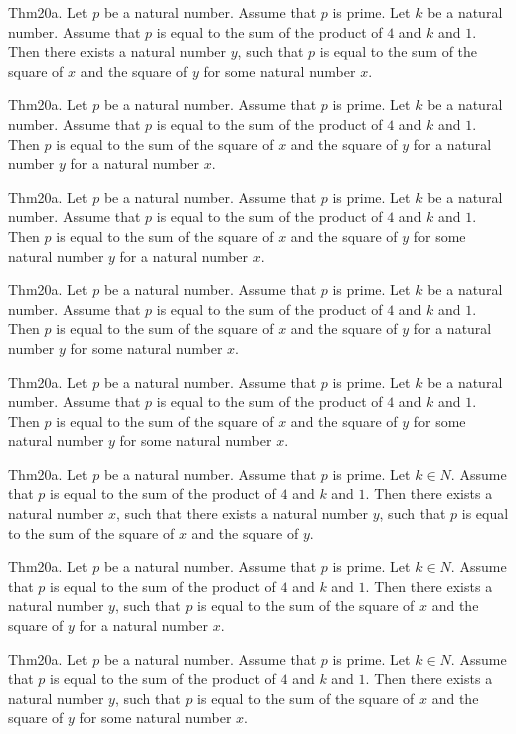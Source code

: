 \documentclass{article}
\begin{document}
Thm20a. Let $p$ be a natural number. Assume that $p$ is prime. Let $k$ be a natural number. Assume that $p$ is equal to the sum of the product of $4$ and $k$ and $1$. Then there exists a natural number $y$, such that $p$ is equal to the sum of the square of $x$ and the square of $y$ for some natural number $x$.

Thm20a. Let $p$ be a natural number. Assume that $p$ is prime. Let $k$ be a natural number. Assume that $p$ is equal to the sum of the product of $4$ and $k$ and $1$. Then $p$ is equal to the sum of the square of $x$ and the square of $y$ for a natural number $y$ for a natural number $x$.

Thm20a. Let $p$ be a natural number. Assume that $p$ is prime. Let $k$ be a natural number. Assume that $p$ is equal to the sum of the product of $4$ and $k$ and $1$. Then $p$ is equal to the sum of the square of $x$ and the square of $y$ for some natural number $y$ for a natural number $x$.

Thm20a. Let $p$ be a natural number. Assume that $p$ is prime. Let $k$ be a natural number. Assume that $p$ is equal to the sum of the product of $4$ and $k$ and $1$. Then $p$ is equal to the sum of the square of $x$ and the square of $y$ for a natural number $y$ for some natural number $x$.

Thm20a. Let $p$ be a natural number. Assume that $p$ is prime. Let $k$ be a natural number. Assume that $p$ is equal to the sum of the product of $4$ and $k$ and $1$. Then $p$ is equal to the sum of the square of $x$ and the square of $y$ for some natural number $y$ for some natural number $x$.

Thm20a. Let $p$ be a natural number. Assume that $p$ is prime. Let $k \in N$. Assume that $p$ is equal to the sum of the product of $4$ and $k$ and $1$. Then there exists a natural number $x$, such that there exists a natural number $y$, such that $p$ is equal to the sum of the square of $x$ and the square of $y$.

Thm20a. Let $p$ be a natural number. Assume that $p$ is prime. Let $k \in N$. Assume that $p$ is equal to the sum of the product of $4$ and $k$ and $1$. Then there exists a natural number $y$, such that $p$ is equal to the sum of the square of $x$ and the square of $y$ for a natural number $x$.

Thm20a. Let $p$ be a natural number. Assume that $p$ is prime. Let $k \in N$. Assume that $p$ is equal to the sum of the product of $4$ and $k$ and $1$. Then there exists a natural number $y$, such that $p$ is equal to the sum of the square of $x$ and the square of $y$ for some natural number $x$.
\end{document}
